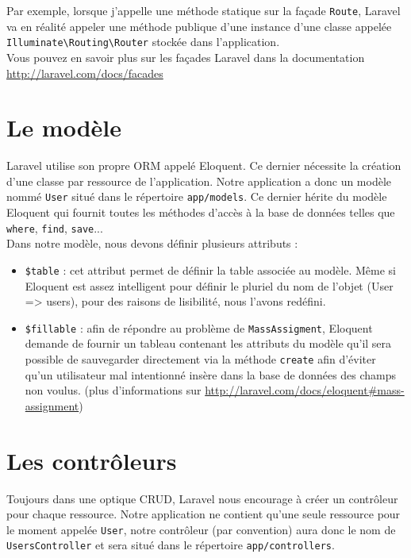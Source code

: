 		Par exemple, lorsque j'appelle une méthode statique sur la façade \verb|Route|, Laravel va en réalité appeler une méthode publique d'une instance d'une classe appelée \verb|Illuminate\Routing\Router| stockée dans l'application.\\

		Vous pouvez en savoir plus sur les façades Laravel dans la documentation \url{http://laravel.com/docs/facades}

\section{Le modèle}
	Laravel utilise son propre ORM appelé Eloquent. Ce dernier nécessite la création d'une classe par ressource de l'application. Notre application a donc un modèle nommé \verb|User| situé dans le répertoire \verb|app/models|. Ce dernier hérite du modèle Eloquent qui fournit toutes les méthodes d'accès à la base de données telles que \verb|where|, \verb|find|, \verb|save|...\\

	Dans notre modèle, nous devons définir plusieurs attributs :
	\begin{itemize}
		\item \verb|$table| : cet attribut permet de définir la table associée au modèle. Même si Eloquent est assez intelligent pour définir le pluriel du nom de l'objet (User => users), pour des raisons de lisibilité, nous l'avons redéfini.
		\item \verb|$fillable| : afin de répondre au problème de \verb|MassAssigment|, Eloquent demande de fournir un tableau contenant les attributs du modèle qu'il sera possible de sauvegarder directement via la méthode \verb|create| afin d'éviter qu'un utilisateur mal intentionné insère dans la base de données des champs non voulus. (plus d'informations sur \url{http://laravel.com/docs/eloquent#mass-assignment})
	\end{itemize}

\section{Les contrôleurs}
	Toujours dans une optique CRUD, Laravel nous encourage à créer un contrôleur pour chaque ressource. Notre application ne contient qu'une seule ressource pour le moment appelée \verb|User|, notre contrôleur (par convention) aura donc le nom de \verb|UsersController| et sera situé dans le répertoire \verb|app/controllers|.\\

